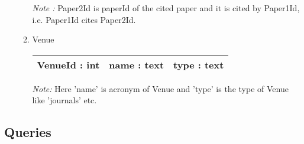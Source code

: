 \documentclass[10pt]{article}
\begin{document}
\begin{itemize}
\begin{enumerate}
\emph{Note :} Paper2Id is paperId of the cited paper and it is cited by Paper1Id, i.e. Paper1Id cites Paper2Id.

\item Venue\\
        \begin{tabular}{|c|c|c|}
            \hline 
             VenueId : int & name : text & type : text\\
            \hline
        \end{tabular}

\emph{Note:} Here 'name' is acronym of Venue and 'type' is the type of Venue like 'journals' etc. 
\end{enumerate}

\end{itemize}

\subsection{Queries}
\end{document}
